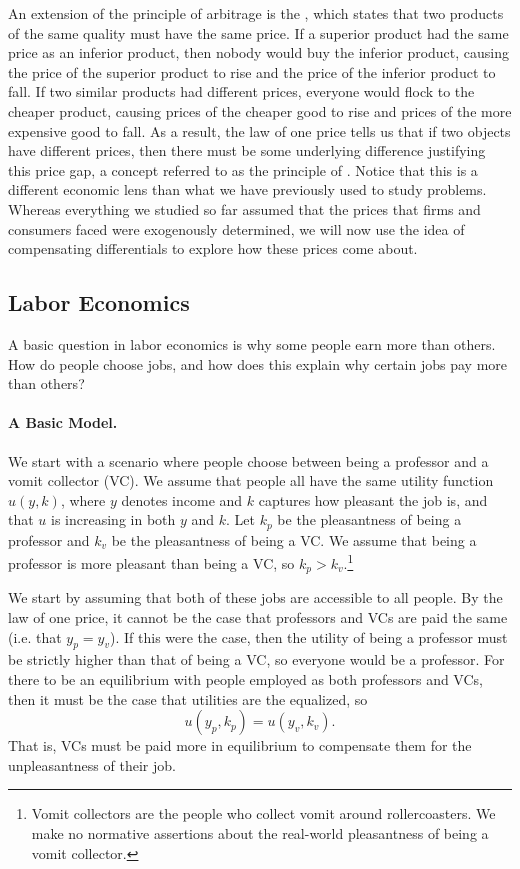 An extension of the principle of arbitrage is the , which states that two products of the same quality must have the same price. If a superior product had the same price as an inferior product, then nobody would buy the inferior product, causing the price of the superior product to rise and the price of the inferior product to fall. If two similar products had different prices, everyone would flock to the cheaper product, causing prices of the cheaper good to rise and prices of the more expensive good to fall. As a result, the law of one price tells us that if two objects have different prices, then there must be some underlying difference justifying this price gap, a concept referred to as the principle of . Notice that this is a different economic lens than what we have previously used to study problems. Whereas everything we studied so far assumed that the prices that firms and consumers faced were exogenously determined, we will now use the idea of compensating differentials to explore how these prices come about.

\subsection*{Labor Economics}

A basic question in labor economics is why some people earn more than others. How do people choose jobs, and how does this explain why certain jobs pay more than others?

\paragraph{A Basic Model.} We start with a scenario where people choose between being a professor and a vomit collector (VC). We assume that people all have the same utility function $u(y, k)$, where $y$ denotes income and $k$ captures how pleasant the job is, and that $u$ is increasing in both $y$ and $k$. Let $k_p$ be the pleasantness of being a professor and $k_v$ be the pleasantness of being a VC. We assume that being a professor is more pleasant than being a VC, so $k_p > k_v.$\footnote{Vomit collectors are the people who collect vomit around rollercoasters. We make no normative assertions about the real-world pleasantness of being a vomit collector.}

We start by assuming that both of these jobs are accessible to all people. By the law of one price, it cannot be the case that professors and VCs are paid the same (i.e. that $y_p = y_v$). If this were the case, then the utility of being a professor must be strictly higher than that of being a VC, so everyone would be a professor. For there to be an equilibrium with people employed as both professors and VCs, then it must be the case that utilities are the equalized, so 
$$u(y_p, k_p) = u(y_v, k_v).$$
That is, VCs must be paid more in equilibrium to compensate them for the unpleasantness of their job.


